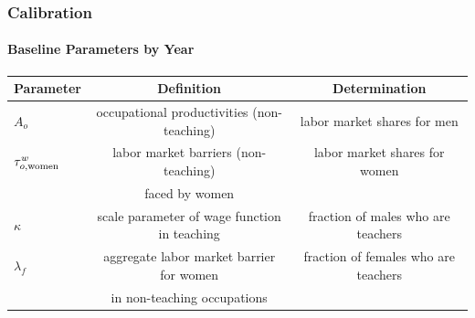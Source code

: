 \documentclass[11pt]{beamer}
\begin{document}
\begin{frame}
	\frametitle{Calibration}
	\framesubtitle{Baseline Parameters by Year}
	\tiny
	\begin{table}[h!]
		\centering
		\begin{tabular}{lcc}
			\toprule
			Parameter & Definition & Determination \\
			\midrule			
			$A_{o}$ & occupational productivities (non-teaching) & labor market shares for men  \\
			$\tau^{w}_{o,{\rm women}}$ & labor market barriers (non-teaching) & labor market shares for women \\
			& faced by women & \\
			$\kappa$ & scale parameter of wage function in teaching & fraction of males who are teachers \\
			$\lambda_f$ & aggregate labor market barrier for women & fraction of females who are teachers \\
			& in non-teaching occupations & \\
			\bottomrule
		\end{tabular}
		\label{tab:param}
	\end{table}
\end{frame}

	



\end{document}

